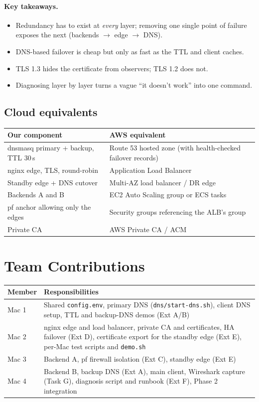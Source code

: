 \documentclass[11pt,a4paper]{article}
\newcommand{\cmd}[1]{\texttt{#1}}
\begin{document}
\paragraph{Key takeaways.}
\begin{itemize}
  \item Redundancy has to exist at \emph{every} layer; removing one single point
        of failure exposes the next (backends $\to$ edge $\to$ DNS).
  \item DNS-based failover is cheap but only as fast as the TTL and client caches.
  \item TLS 1.3 hides the certificate from observers; TLS 1.2 does not.
  \item Diagnosing layer by layer turns a vague ``it doesn't work'' into one command.
\end{itemize}

\subsection*{Cloud equivalents}
\begin{tabularx}{\textwidth}{l X}
\toprule
\textbf{Our component} & \textbf{AWS equivalent} \\
\midrule
dnsmasq primary + backup, TTL 30\,s & Route 53 hosted zone (with health-checked failover records) \\
nginx edge, TLS, round-robin & Application Load Balancer \\
Standby edge + DNS cutover & Multi-AZ load balancer / DR edge \\
Backends A and B & EC2 Auto Scaling group or ECS tasks \\
pf anchor allowing only the edges & Security groups referencing the ALB's group \\
Private CA & AWS Private CA / ACM \\
\bottomrule
\end{tabularx}

\section{Team Contributions}

\begin{tabularx}{\textwidth}{l X}
\toprule
\textbf{Member} & \textbf{Responsibilities} \\
\midrule
Mac 1 & Shared \cmd{config.env}, primary DNS (\cmd{dns/start-dns.sh}), client DNS setup, TTL and backup-DNS demos (Ext A/B) \\
Mac 2 & nginx edge and load balancer, private CA and certificates, HA failover (Ext D), certificate export for the standby edge (Ext E), per-Mac test scripts and \cmd{demo.sh} \\
Mac 3 & Backend A, pf firewall isolation (Ext C), standby edge (Ext E) \\
Mac 4 & Backend B, backup DNS (Ext A), main client, Wireshark capture (Task G), diagnosis script and runbook (Ext F), Phase 2 integration \\
\bottomrule
\end{tabularx}
\end{document}
